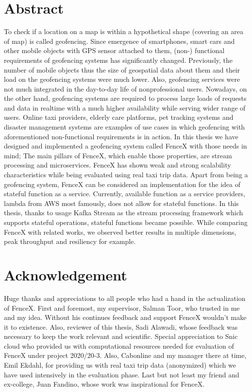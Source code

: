 \documentclass[a4]{report}
\begin{document}
    \section*{Abstract}
    To check if a location on a map is within a hypothetical shape (covering an area of map) is called geofencing.
    Since emergence of smartphones, smart cars and other mobile objects with GPS sensor attached to them, (non-)
    functional requirements of geofencing systems has significantly changed.
    Previously, the number of mobile objects thus the size of geospatial data about them and their load on the
    geofencing systems were much lower.
    Also, geofencing services were not much integrated in the day-to-day life of nonprofessional users.
    Nowadays, on the other hand, geofencing systems are required to process large loads of requests and data in
    realtime with a much higher availability while serving wider range of users.
    Online taxi providers, elderly care platforms, pet tracking systems and disaster management systems are examples
    of use cases in which geofencing with aforementioned non-functional requirements is in action.
    In this thesis we have designed and implemented a geofencing system called FenceX with those needs in mind;
    The main pillars of FenceX, which enable those properties, are stream processing and microservices.
    FenceX has shown weak and strong scalability characteristics while being evaluated using real taxi trip data.
    Apart from being a geofencing system, FenceX can be considered an implementation for the idea of stateful function
    as a service.
    Currently, available function as a service providers, lambda from AWS most famously, does not allow for stateful
    functions.
    In this thesis, thanks to usage Kafka Stream as the stream processing framework which supports stateful
    operations, stateful functions became possible.
    While comparing FenceX with related works, we observed better results in multiple dimensions, peak throughput
    and resiliency for example.

    \section*{Acknowledgement}
    Huge thanks and appreciations to all people who had a hand in the actualization of FenceX.
    First and foremost, my supervisor, Salman Toor, who trusted in me and my idea.
    Without his continues feedback and support FenceX wouldn't make it to existence.
    Also, reviewer of this thesis, Sadi Alawadi, whose feedback was necessary to keep the work relevant and
    scientific.
    Special appreciation to Snic cloud who provided us with computational resources needed for evaluation of FenceX
    under project 2020/20-3.
    Also, Cabonline and my manager there at time,  Emil Ekdahl, for providing us with real taxi trip data
    (anonymized) which we have used intensively in the evaluation phase.
    Last but not least my friend and ex-college, Juan Fandino, whose work was inspirational for FenceX.
\end{document}
